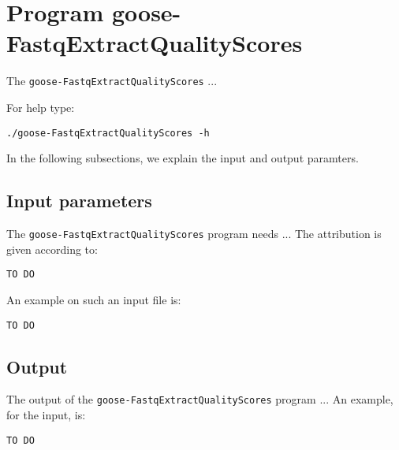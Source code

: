 \section{Program goose-FastqExtractQualityScores}
The \texttt{goose-FastqExtractQualityScores} ...

For help type:
\begin{lstlisting}
./goose-FastqExtractQualityScores -h
\end{lstlisting}
In the following subsections, we explain the input and output paramters.

\subsection*{Input parameters}

The \texttt{goose-FastqExtractQualityScores} program needs ...
The attribution is given according to:
\begin{lstlisting}
TO DO
\end{lstlisting}

An example on such an input file is:
\begin{lstlisting}
TO DO
\end{lstlisting}

\subsection*{Output}
The output of the \texttt{goose-FastqExtractQualityScores} program ...
An example, for the input, is:
\begin{lstlisting}
TO DO
\end{lstlisting}
